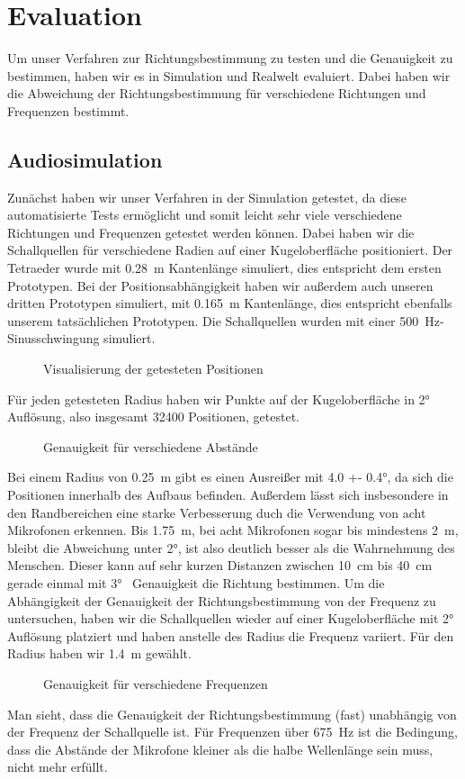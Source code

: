 \section{Evaluation}
Um unser Verfahren zur Richtungsbestimmung zu testen und die Genauigkeit zu bestimmen, haben wir es in Simulation und Realwelt evaluiert. Dabei haben wir die Abweichung der Richtungsbestimmung für verschiedene Richtungen und Frequenzen bestimmt.
\subsection{Audiosimulation}
Zunächst haben wir unser Verfahren in der Simulation getestet, da diese automatisierte Tests ermöglicht und somit leicht sehr viele verschiedene Richtungen und Frequenzen getestet werden können. Dabei haben wir die Schallquellen für verschiedene Radien auf einer Kugeloberfläche positioniert. Der Tetraeder wurde mit \SI{0.28}{\meter} Kantenlänge simuliert, dies entspricht dem ersten Prototypen. Bei der Positionsabhängigkeit haben wir außerdem auch unseren dritten Prototypen simuliert, mit \SI{0.165}{\meter} Kantenlänge, dies entspricht ebenfalls unserem tatsächlichen Prototypen. Die Schallquellen wurden mit einer \SI{500}{\hertz}-Sinusschwingung simuliert.
\begin{figure}[H]
  \centering
  \resizebox{0.850\textwidth}{!}{}
  \caption{Visualisierung der getesteten Positionen\label{fig:pos}}
\end{figure}
Für jeden getesteten Radius haben wir Punkte auf der Kugeloberfläche in \ang{2} Auflösung, also insgesamt \num{32400} Positionen, getestet.
\begin{figure}[H]
  \centering
  \resizebox{0.750\textwidth}{!}{}
  \caption{Genauigkeit für verschiedene Abstände\label{fig:pos_sweep}}
\end{figure}
Bei einem Radius von \SI{0.25}{\meter} gibt es einen Ausreißer mit \ang[separate-uncertainty = true]{4.0 +- 0.4}, da sich die Positionen innerhalb des Aufbaus befinden. Außerdem lässt sich insbesondere in den Randbereichen eine starke Verbesserung duch die Verwendung von acht Mikrofonen erkennen. Bis \SI{1.75}{\meter}, bei acht Mikrofonen sogar bis mindestens \SI{2}{\meter}, bleibt die Abweichung unter \ang{2}, ist also deutlich besser als die Wahrnehmung des Menschen. Dieser kann auf sehr kurzen Distanzen zwischen \SI{10}{\centi\meter} bis \SI{40}{\centi\meter} gerade einmal mit \ang{3}~\cite{middlebrooks1991sound} Genauigkeit die Richtung bestimmen.
Um die Abhängigkeit der Genauigkeit der Richtungsbestimmung von der Frequenz zu untersuchen, haben wir die Schallquellen wieder auf einer Kugeloberfläche mit \ang{2} Auflösung platziert und haben anstelle des Radius die Frequenz variiert. Für den Radius haben wir \SI{1.4}{\meter} gewählt.
\begin{figure}[H]
  \centering
  
  \caption{Genauigkeit für verschiedene Frequenzen\label{fig:freq_seep}}
\end{figure}
Man sieht, dass die Genauigkeit der Richtungsbestimmung (fast) unabhängig von der Frequenz der Schallquelle ist. Für Frequenzen über \SI{675}{\hertz} ist die Bedingung, dass die Abstände der Mikrofone kleiner als die halbe Wellenlänge sein muss, nicht mehr erfüllt.
